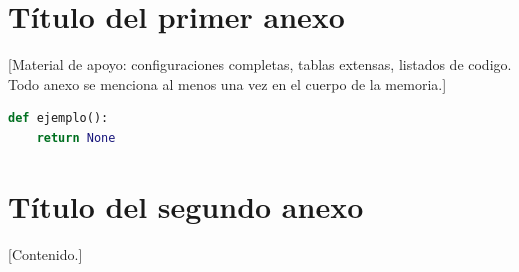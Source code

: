 \chapter{T\'itulo del primer anexo}
\label{anx:primero}

[Material de apoyo: configuraciones completas, tablas extensas, listados de
codigo. Todo anexo se menciona al menos una vez en el cuerpo de la memoria.]

\begin{lstlisting}[language=Python,caption={Fragmento de codigo de ejemplo.},label={lst:ejemplo}]
def ejemplo():
    return None
\end{lstlisting}

\chapter{T\'itulo del segundo anexo}
\label{anx:segundo}

[Contenido.]
